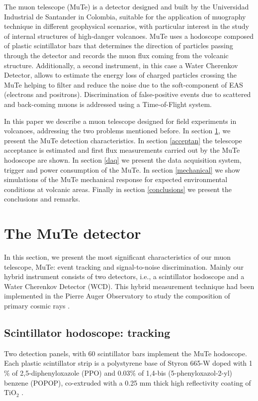 \documentclass[letterpaper,11pt]{article}
\begin{document}
The muon telescope (MuTe) \cite{AsoreyEtal2017B, SierraPortaEtal2018} is a detector designed and built by the Universidad Industrial de Santander in Colombia, suitable for the application of muography technique in different geophysical scenarios, with particular interest in the study of internal structures of high-danger volcanoes. MuTe uses a hodoscope composed of plastic scintillator bars that determines the direction of particles passing through the detector and records the muon flux coming from the volcanic structure. Additionally, a second instrument, in this case a Water Cherenkov Detector, allows to estimate the energy loss of charged particles crossing the MuTe helping to filter and reduce the noise due to the soft-component of EAS (electrons and positrons). Discrimination of false-positive events due to scattered and back-coming muons is addressed using a Time-of-Flight system.

In this paper we describe a muon telescope designed for field experiments in volcanoes, addressing the two problems mentioned before. In section \ref{detector}, we present the MuTe detection characteristics. In section \ref{acceptan} the telescope acceptance is estimated and first flux measurements carried out by the MuTe hodoscope are shown. In section \ref{daq} we present the data acquisition system, trigger and power consumption of the MuTe. In section \ref{mechanical} we show simulations of the MuTe mechanical response for expected environmental conditions at volcanic areas. Finally in section \ref{conclusions} we present the conclusions and remarks.

\section{The MuTe detector}
\label{detector}
In this section, we present the most significant characteristics of our muon telescope, MuTe: event tracking and signal-to-noise discrimination. Mainly our hybrid instrument consists of two detectors, i.e., a scintillator hodoscope and a Water Cherenkov Detector (WCD). This hybrid measurement technique had been implemented in the Pierre Auger Observatory to study the composition of primary cosmic rays \cite{martello2017pierre, aab2017muon, aab2016prototype}. 

\subsection{Scintillator hodoscope: tracking}
Two detection panels, with 60 scintillator bars  implement the MuTe hodoscope. Each plastic scintillator strip is a polystyrene base of Styron 665-W doped with 1$\%$ of 2,5-diphenyloxazole (PPO) and 0.03$\%$ of 1,4-bis (5-phenyloxazol-2-yl) benzene (POPOP), co-extruded with a 0.25 mm thick high reflectivity coating of $\text{TiO}_{\text{2}}$ \cite{PlaDalmau2003}. 
\end{document}
